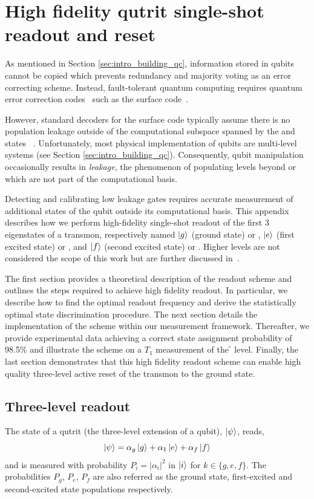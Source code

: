 \chapter{High fidelity qutrit single-shot readout and reset} \label{ch:qutrit_readout}

As mentioned in Section \ref{sec:intro_building_qc}, information stored in qubits cannot be copied which prevents redundancy and majority voting as an error correcting scheme. Instead, fault-tolerant quantum computing requires quantum error correction codes~\cite{Gottesman2010AnComputation, DiVincenzo1996Fault-TolerantCodes} such as the surface code~\cite{Fowler2012SurfaceComputation}. 

However, standard decoders for the surface code typically assume there is no population leakage outside of the computational subspace spanned by the \0 and \1 states ~\cite{Ghosh2015}. Unfortunately, most physical implementation of qubits are multi-level systems (see Section \ref{sec:intro_building_qc}). Consequently, qubit manipulation occasionally results in \textit{leakage}, the phenomenon of populating levels beyond \0 or \1 which are not part of the computational basis. 

Detecting and calibrating low leakage gates requires accurate measurement of additional states of the qubit outside its computational basis. This appendix describes how we perform high-fidelity single-shot readout of the first 3 eigenstates of a transmon, respectively named $\ket{g}$ (ground state) or \0, $\ket{e}$ (first excited state) or \1, and $\ket{f}$ (second excited state) or \2. Higher levels are not considered the scope of this work but are further discussed in~\cite{Sank2016Measurement-InducedApproximation, ElderHigh-fidelityCircuits}.

The first section provides a theoretical description of the readout scheme and outlines the steps required to achieve high fidelity readout. In particular, we describe how to find the optimal readout frequency and derive the statistically optimal state discrimination procedure. The next section details the implementation of the scheme within our measurement framework.  Thereafter, we provide experimental data achieving a correct state assignment probability of 98.5\% and illustrate the scheme on a $T_1$ measurement of the \f{} level. Finally, the last section demonstrates that this high fidelity readout scheme can enable high quality three-level active reset of the transmon to the ground state.

\section{Three-level readout}
\label{s:high_level_description}
The state of a qutrit (the three-level extension of a qubit), $\ket{\psi}$, reads,
\begin{equation} \label{eq:qutrit_state}
    \ket{\psi} = \alpha_g \ket{g} + \alpha_1 \ket{e} + \alpha_f \ket{f}
\end{equation}
and is measured with probability $P_i = |\alpha_i|^2$ in $\ket{i}$ for $k \in \{g,e,f\}$. The probabilities $P_g$, $P_e$, $P_f$ are also referred as the ground state, first-excited and second-excited state populations respectively.

